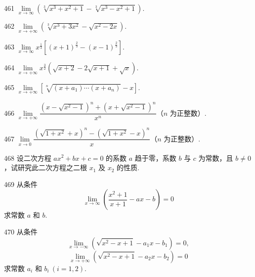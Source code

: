 \begin{prob}[S]{461}
$\lim\limits_{x \to \infty} \left(\sqrt[3]{x^3 + x^2 + 1} - \sqrt[3]{x^3 - x^2 + 1}\right)$.
\end{prob}

\begin{prob}[S]{462}
$\lim\limits_{x \to +\infty} \left(\sqrt[3]{x^3 + 3x^2} - \sqrt{x^2 - 2x}\right)$.
\end{prob}

\begin{prob}[S]{463}
$\lim\limits_{x \to \infty} x^{\frac{1}{3}} \left[(x + 1)^{\frac{2}{3}} - (x - 1)^{\frac{2}{3}}\right]$.
\end{prob}

\begin{prob}[S]{464}
$\lim\limits_{x \to +\infty} x^{\frac{3}{2}} \left(\sqrt{x + 2} - 2\sqrt{x + 1} + \sqrt{x}\right)$.
\end{prob}

\begin{prob}[S]{465}
$\lim\limits_{x \to +\infty} \left[\sqrt[n]{(x + a_1)\cdots(x + a_n)} - x\right]$.
\end{prob}

\begin{prob}[S]{466}
$\lim\limits_{x \to +\infty} \dfrac{\left(x - \sqrt{x^2 - 1}\right)^n + \left(x + \sqrt{x^2 - 1}\right)^n}{x^n}$（$n$ 为正整数）.
\end{prob}

\begin{prob}[S]{467}
$\lim\limits_{x \to 0} \dfrac{\left(\sqrt{1 + x^2} + x\right)^n - \left(\sqrt{1 + x^2} - x\right)^n}{x}$（$n$ 为正整数）.
\end{prob}

\begin{prob}[M]{468}
设二次方程 $ax^2 + bx + c = 0$ 的系数 $a$ 趋于零，系数 $b$ 与 $c$ 为常数，且 $b \neq 0$，试研究此二次方程之二根 $x_1$ 及 $x_2$ 的性质.
\end{prob}

\begin{prob}[M]{469}
从条件
\[
\lim_{x \to \infty} \left(\frac{x^2 + 1}{x + 1} - ax - b\right) = 0
\]
求常数 $a$ 和 $b$.
\end{prob}

\begin{prob}[M]{470}
从条件
\[
\lim_{x \to -\infty} \left(\sqrt{x^2 - x + 1} - a_1 x - b_1\right) = 0,
\]
\[
\lim_{x \to +\infty} \left(\sqrt{x^2 - x + 1} - a_2 x - b_2\right) = 0
\]
求常数 $a_i$ 和 $b_i\ (i = 1, 2)$.
\end{prob}


